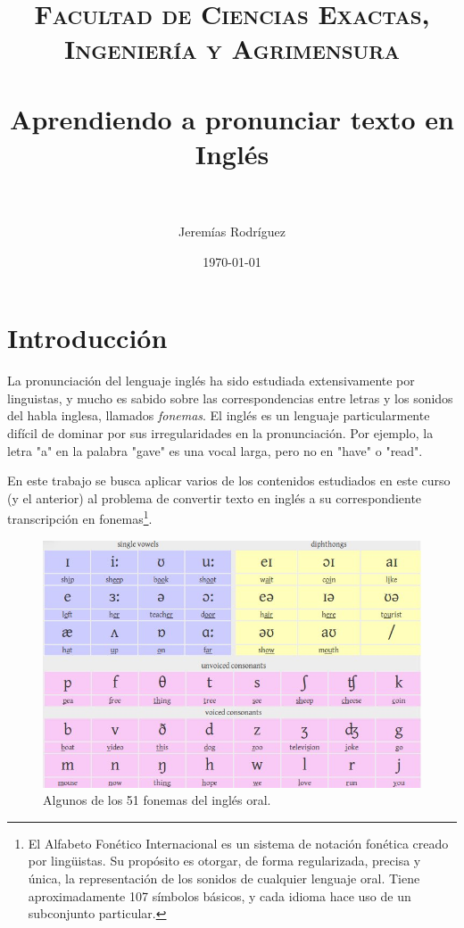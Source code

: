 \documentclass[paper=a4, fontsize=11pt]{scrartcl} %
\title{   
\normalfont \normalsize 
\textsc{Facultad de Ciencias Exactas, Ingeniería y Agrimensura} \\ [25pt] %
\horrule{0.5pt} \\[0.4cm] %
\huge Aprendiendo a pronunciar texto en Inglés \\ %
\horrule{2pt} \\[0.5cm] %
}
\author{Jeremías Rodríguez} %
\date{\normalsize\today} %
\numberwithin{equation}{section} %
\numberwithin{figure}{section} %
\numberwithin{table}{section} %
\begin{document}
\maketitle %


\section{Introducción}

\par La pronunciación del lenguaje inglés ha sido estudiada extensivamente por linguistas, y mucho es sabido sobre las correspondencias entre letras y los sonidos del habla inglesa, llamados \emph{fonemas}.  El inglés es un lenguaje particularmente difícil de dominar por sus irregularidades en la pronunciación. Por ejemplo, la letra "a" en la palabra "gave" es una vocal larga,  pero no en "have" o "read".\\
\par En este trabajo se busca aplicar varios de los contenidos estudiados en este curso (y el anterior) al problema de convertir texto en inglés a su correspondiente transcripción en fonemas\footnote{El Alfabeto Fonético Internacional es un sistema de notación fonética creado por lingüistas. Su propósito es otorgar, de forma regularizada, precisa y única, la representación de los sonidos de cualquier lenguaje oral. Tiene aproximadamente 107 símbolos básicos, y cada idioma hace uso de un subconjunto particular.}. \\

\begin{figure}[h!]
\centering
\includegraphics[width=120mm]{phonemicChart.jpg}
\caption{Algunos de los 51 fonemas del inglés oral.}
\label{fig:method}
\end{figure}
\end{document}
